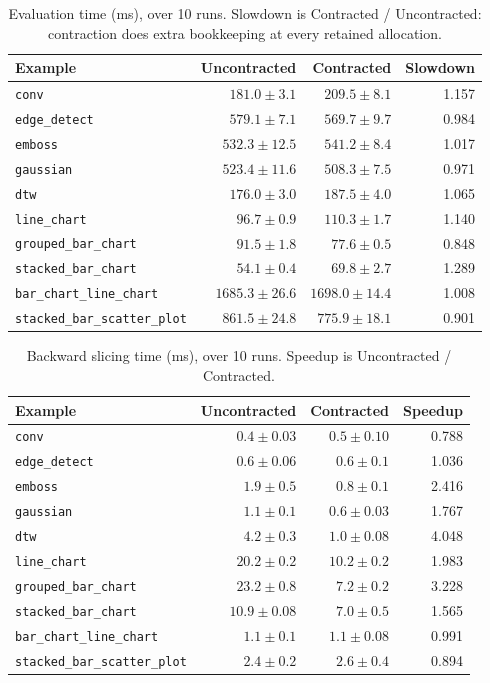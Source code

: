 \begin{table}[htbp]
\centering
\small
\begin{tabular}{l r r r}
\toprule
Example & Uncontracted & Contracted & Slowdown \\
\midrule
\texttt{conv} & $181.0 \pm 3.1$ & $209.5 \pm 8.1$ & 1.157 \\
\texttt{edge\_detect} & $579.1 \pm 7.1$ & $569.7 \pm 9.7$ & 0.984 \\
\texttt{emboss} & $532.3 \pm 12.5$ & $541.2 \pm 8.4$ & 1.017 \\
\texttt{gaussian} & $523.4 \pm 11.6$ & $508.3 \pm 7.5$ & 0.971 \\
\texttt{dtw} & $176.0 \pm 3.0$ & $187.5 \pm 4.0$ & 1.065 \\
\texttt{line\_chart} & $96.7 \pm 0.9$ & $110.3 \pm 1.7$ & 1.140 \\
\texttt{grouped\_bar\_chart} & $91.5 \pm 1.8$ & $77.6 \pm 0.5$ & 0.848 \\
\texttt{stacked\_bar\_chart} & $54.1 \pm 0.4$ & $69.8 \pm 2.7$ & 1.289 \\
\texttt{bar\_chart\_line\_chart} & $1685.3 \pm 26.6$ & $1698.0 \pm 14.4$ & 1.008 \\
\texttt{stacked\_bar\_scatter\_plot} & $861.5 \pm 24.8$ & $775.9 \pm 18.1$ & 0.901 \\
\bottomrule
\end{tabular}
\caption{Evaluation time (ms), over 10 runs. Slowdown is Contracted / Uncontracted: contraction does extra bookkeeping at every retained allocation.}
\label{tab:contracted-eval}
\end{table}

\begin{table}[htbp]
\centering
\small
\begin{tabular}{l r r r}
\toprule
Example & Uncontracted & Contracted & Speedup \\
\midrule
\texttt{conv} & $0.4 \pm 0.03$ & $0.5 \pm 0.10$ & 0.788 \\
\texttt{edge\_detect} & $0.6 \pm 0.06$ & $0.6 \pm 0.1$ & 1.036 \\
\texttt{emboss} & $1.9 \pm 0.5$ & $0.8 \pm 0.1$ & 2.416 \\
\texttt{gaussian} & $1.1 \pm 0.1$ & $0.6 \pm 0.03$ & 1.767 \\
\texttt{dtw} & $4.2 \pm 0.3$ & $1.0 \pm 0.08$ & 4.048 \\
\texttt{line\_chart} & $20.2 \pm 0.2$ & $10.2 \pm 0.2$ & 1.983 \\
\texttt{grouped\_bar\_chart} & $23.2 \pm 0.8$ & $7.2 \pm 0.2$ & 3.228 \\
\texttt{stacked\_bar\_chart} & $10.9 \pm 0.08$ & $7.0 \pm 0.5$ & 1.565 \\
\texttt{bar\_chart\_line\_chart} & $1.1 \pm 0.1$ & $1.1 \pm 0.08$ & 0.991 \\
\texttt{stacked\_bar\_scatter\_plot} & $2.4 \pm 0.2$ & $2.6 \pm 0.4$ & 0.894 \\
\bottomrule
\end{tabular}
\caption{Backward slicing time (ms), over 10 runs. Speedup is Uncontracted / Contracted.}
\label{tab:contracted-demands}
\end{table}

